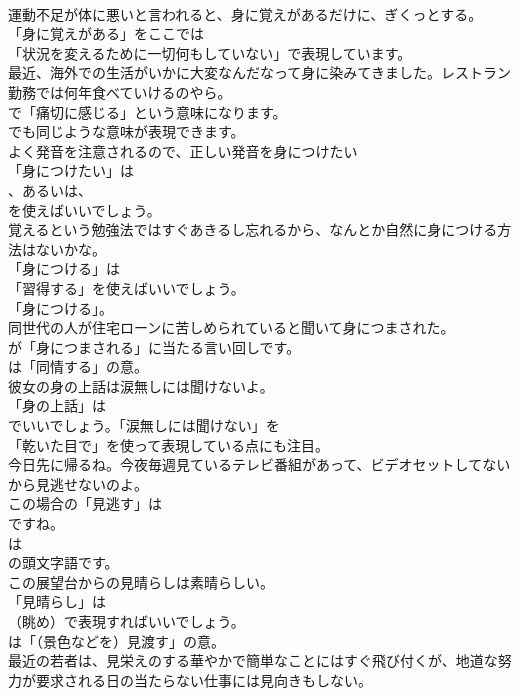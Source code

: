 \documentclass[8pt]{extreport}
\begin{document}
\begin{CJK}{UTF8}{min}
\\	運動不足が体に悪いと言われると、身に覚えがあるだけに、ぎくっとする。 
\\	「身に覚えがある」をここでは
\\	「状況を変えるために一切何もしていない」で表現しています。	
\\	最近、海外での生活がいかに大変なんだなって身に染みてきました。レストラン勤務では何年食べていけるのやら。 
\\	で「痛切に感じる」という意味になります。
\\	でも同じような意味が表現できます。	
\\	よく発音を注意されるので、正しい発音を身につけたい 
\\	「身につけたい」は
\\	、あるいは、
\\	を使えばいいでしょう。	
\\	覚えるという勉強法ではすぐあきるし忘れるから、なんとか自然に身につける方法はないかな。 
\\	「身につける」は
\\	「習得する」を使えばいいでしょう。
\\	「身につける」。	
\\	同世代の人が住宅ローンに苦しめられていると聞いて身につまされた。 
\\	が「身につまされる」に当たる言い回しです。
\\	は「同情する」の意。	
\\	彼女の身の上話は涙無しには聞けないよ。 
\\	「身の上話」は
\\	でいいでしょう。「涙無しには聞けない」を
\\	「乾いた目で」を使って表現している点にも注目。	
\\	今日先に帰るね。今夜毎週見ているテレビ番組があって、ビデオセットしてないから見逃せないのよ。 
\\	この場合の「見逃す」は
\\	ですね。
\\	は
\\	の頭文字語です。	
\\	この展望台からの見晴らしは素晴らしい。 
\\	「見晴らし」は 
\\	（眺め）で表現すればいいでしょう。
\\	は「（景色などを）見渡す」の意。	
\\	最近の若者は、見栄えのする華やかで簡単なことにはすぐ飛び付くが、地道な努力が要求される日の当たらない仕事には見向きもしない。 

\end{CJK}
\end{document}
